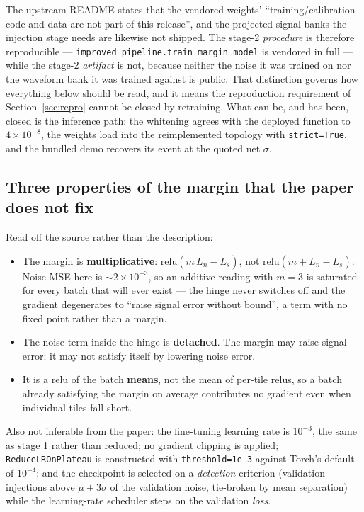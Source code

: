 \documentclass[11pt]{article}
\begin{document}
The upstream README states that the vendored weights' ``training/calibration code and
data are not part of this release'', and the projected signal banks the injection stage
needs are likewise not shipped. The stage-2 \emph{procedure} is therefore reproducible
--- \texttt{improved\_pipeline.train\_margin\_model} is vendored in full --- while the
stage-2 \emph{artifact} is not, because neither the noise it was trained on nor the
waveform bank it was trained against is public. That distinction governs how everything
below should be read, and it means the reproduction requirement of
Section~\ref{sec:repro} cannot be closed by retraining. What can be, and has been,
closed is the inference path: the whitening agrees with the deployed function to
$4\times10^{-8}$, the weights load into the reimplemented topology with
\texttt{strict=True}, and the bundled demo recovers its event at the quoted net
$\sigma$.

\subsection*{Three properties of the margin that the paper does not fix}

Read off the source rather than the description:
\begin{itemize}
\item The margin is \textbf{multiplicative}: $\mathrm{relu}(m\,\overline{L_n} -
\overline{L_s})$, not $\mathrm{relu}(m + \overline{L_n} - \overline{L_s})$. Noise MSE
here is $\sim2\times10^{-3}$, so an additive reading with $m=3$ is saturated for every
batch that will ever exist --- the hinge never switches off and the gradient degenerates
to ``raise signal error without bound'', a term with no fixed point rather than a margin.
\item The noise term inside the hinge is \textbf{detached}. The margin may raise signal
error; it may not satisfy itself by lowering noise error.
\item It is a $\mathrm{relu}$ of the batch \textbf{means}, not the mean of per-tile
$\mathrm{relu}$s, so a batch already satisfying the margin on average contributes no
gradient even when individual tiles fall short.
\end{itemize}
Also not inferable from the paper: the fine-tuning learning rate is $10^{-3}$, the same
as stage 1 rather than reduced; no gradient clipping is applied;
\texttt{ReduceLROnPlateau} is constructed with \texttt{threshold=1e-3} against Torch's
default of $10^{-4}$; and the checkpoint is selected on a \emph{detection} criterion
(validation injections above $\mu+3\sigma$ of the validation noise, tie-broken by mean
separation) while the learning-rate scheduler steps on the validation \emph{loss}.
\end{document}
